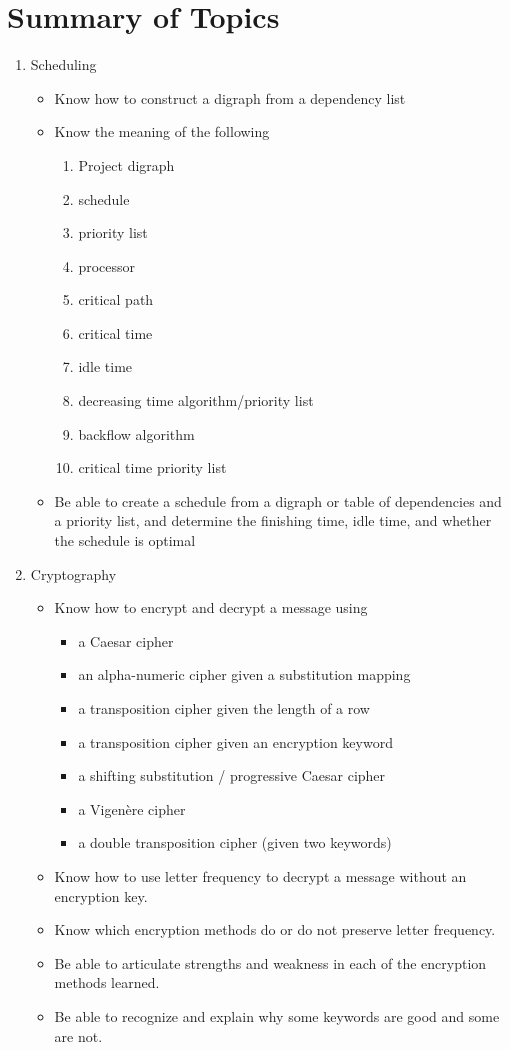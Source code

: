 \documentclass[12pt]{article}
\def\be{\begin{enumerate}}
\def\ee{\end{enumerate}}
\begin{document}
\section*{Summary of Topics}
\begin{enumerate}
\item Scheduling
\begin{itemize}
\item Know how to construct a digraph from a dependency list
\item Know the meaning of the following
\be
\item Project digraph
\item schedule
\item priority list
\item processor
\item critical path
\item critical time
\item idle time
\item decreasing time algorithm/priority list
\item backflow algorithm
\item critical time priority list
\ee
\item Be able to create a schedule from a digraph or table of dependencies and a priority list, and determine the finishing time, idle time, and whether the schedule is optimal
\end{itemize}
\item Cryptography
	\begin{itemize}
	\item Know how to encrypt and decrypt a message using
		\begin{itemize}
		\item a Caesar cipher
		\item an alpha-numeric cipher given a substitution mapping
		\item a transposition cipher given the length of a row
		\item a transposition cipher given an encryption keyword
		\item a shifting substitution / progressive Caesar cipher
		\item a Vigen\`{e}re cipher
		\item a double transposition cipher (given two keywords)
		\end{itemize}
	\item Know how to use letter frequency to decrypt a message without an encryption key.
	\item Know which encryption methods do or do not preserve letter frequency.
	\item Be able to articulate strengths and weakness in each of the encryption methods learned.
	\item Be able to recognize and explain why some keywords are good and some are not.
	\end{itemize}		
\end{enumerate}
\end{document}
